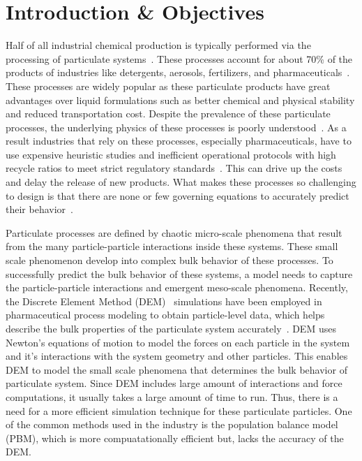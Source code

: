 \documentclass[preprint,11pt,authoryear]{elsarticle}
\begin{document}
\section{Introduction \& Objectives} 
Half of all industrial chemical production is typically performed via the 
processing of particulate systems~\citep{seville1997}. These processes account for about 70\% of the products 
of industries like detergents, aerosols, fertilizers, and pharmaceuticals~\citep{Litster2016}. 
These processes are widely popular as these particulate products have great advantages over 
liquid formulations such as better chemical and physical stability and reduced 
transportation cost. Despite the prevalence of these particulate processes, the underlying 
physics of these processes is poorly understood~\citep{Rogers2013}. As a result industries 
that rely on these processes, especially pharmaceuticals, have to use expensive 
heuristic studies and inefficient operational protocols with high recycle ratios to meet strict 
regulatory standards~\citep{Ramachandran2009}. This can drive up the costs and delay the release of 
new products. What makes these processes so challenging to design is that there are none or few governing 
equations to accurately predict their behavior~\citep{sen2013}.

Particulate processes are defined by chaotic micro-scale phenomena that result from the many 
particle-particle interactions inside these systems. These small scale phenomenon develop into 
complex bulk behavior of these processes. To successfully predict the bulk behavior of these 
systems, a model needs to capture the particle-particle interactions and emergent meso-scale phenomena. 
Recently, the Discrete Element Method (DEM)~\citep{Cundall1979} simulations have been employed in 
pharmaceutical process modeling to obtain particle-level data, which helps describe the bulk properties
of the particulate system accurately~\citep{Hancock2011}. DEM uses Newton's equations of 
motion to model the forces on each particle in the system and it's interactions with the system 
geometry and other particles. This enables DEM to model the small scale phenomena that 
determines the bulk behavior of particulate system. Since DEM includes large amount of interactions
and force computations, it usually takes a large amount of time to run. Thus, there is a need for a 
more efficient simulation technique for these particulate particles. One of the common methods used 
in the industry is the population balance model (PBM), which is more compuatationally efficient but,
lacks the accuracy of the DEM.
\end{document}
